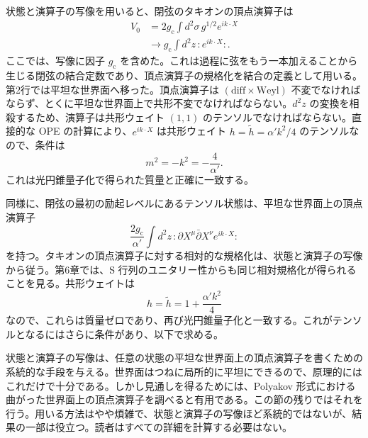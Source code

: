 \label{sec:3.6}

状態と演算子の写像を用いると、閉弦のタキオンの頂点演算子は
\begin{equation}
\begin{aligned}
V_0&=2g_{\mathrm c}\int d^2\sigma\,g^{1/2}e^{ik\cdot X}\\
&\longrightarrow g_{\mathrm c}\int d^2z\,:e^{ik\cdot X}:.
\end{aligned}
\tag{3.6.1}\label{eq:3.6.1}
\end{equation}
ここでは、写像に因子 $g_{\mathrm c}$ を含めた。これは過程に弦をもう一本加えることから生じる閉弦の結合定数であり、頂点演算子の規格化を結合の定義として用いる。第2行では平坦な世界面へ移った。頂点演算子は $(\mathrm{diff}\times\mathrm{Weyl})$ 不変でなければならず、とくに平坦な世界面上で共形不変でなければならない。$d^2z$ の変換を相殺するため、演算子は共形ウェイト $(1,1)$ のテンソルでなければならない。直接的な OPE の計算により、$e^{ik\cdot X}$ は共形ウェイト $h=\widetilde h=\alpha'k^2/4$ のテンソルなので、条件は
\begin{equation}
m^2=-k^2=-\frac4{\alpha'}.
\tag{3.6.2}\label{eq:3.6.2}
\end{equation}
これは光円錐量子化で得られた質量と正確に一致する。

同様に、閉弦の最初の励起レベルにあるテンソル状態は、平坦な世界面上の頂点演算子
\begin{equation}
\frac{2g_{\mathrm c}}{\alpha'}\int d^2z\,
:\partial X^\mu\bar\partial X^\nu e^{ik\cdot X}:
\tag{3.6.3}\label{eq:3.6.3}
\end{equation}
を持つ。タキオンの頂点演算子に対する相対的な規格化は、状態と演算子の写像から従う。第6章では、S 行列のユニタリー性からも同じ相対規格化が得られることを見る。共形ウェイトは
\begin{equation}
h=\widetilde h=1+\frac{\alpha'k^2}{4}
\tag{3.6.4}\label{eq:3.6.4}
\end{equation}
なので、これらは質量ゼロであり、再び光円錐量子化と一致する。これがテンソルとなるにはさらに条件があり、以下で求める。


状態と演算子の写像は、任意の状態の平坦な世界面上の頂点演算子を書くための系統的な手段を与える。世界面はつねに局所的に平坦にできるので、原理的にはこれだけで十分である。しかし見通しを得るためには、Polyakov 形式における曲がった世界面上の頂点演算子を調べると有用である。この節の残りではそれを行う。用いる方法はやや煩雑で、状態と演算子の写像ほど系統的ではないが、結果の一部は役立つ。読者はすべての詳細を計算する必要はない。

